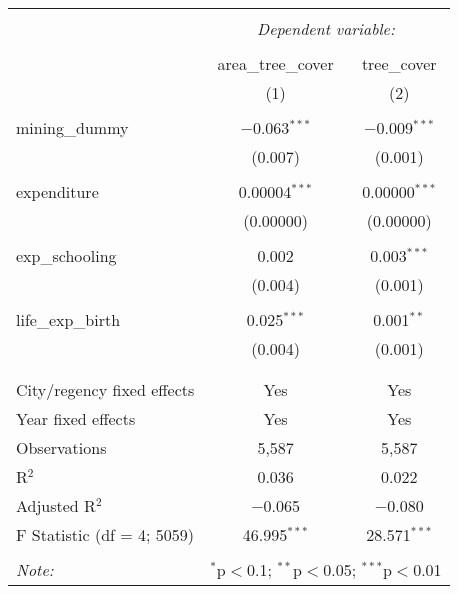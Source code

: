 
\begin{tabular}{@{\extracolsep{5pt}}lcc} 
\\[-1.8ex]\hline 
\hline \\[-1.8ex] 
 & \multicolumn{2}{c}{\textit{Dependent variable:}} \\ 
\cline{2-3} 
\\[-1.8ex] & area\_tree\_cover & tree\_cover \\ 
 & (1) & (2) \\ 
\hline \\[-1.8ex] 
 mining\_dummy & $-$0.063$^{***}$ & $-$0.009$^{***}$ \\ 
  & (0.007) & (0.001) \\ 
  & & \\ 
 expenditure & 0.00004$^{***}$ & 0.00000$^{***}$ \\ 
  & (0.00000) & (0.00000) \\ 
  & & \\ 
 exp\_schooling & 0.002 & 0.003$^{***}$ \\ 
  & (0.004) & (0.001) \\ 
  & & \\ 
 life\_exp\_birth & 0.025$^{***}$ & 0.001$^{**}$ \\ 
  & (0.004) & (0.001) \\ 
  & & \\ 
\hline \\[-1.8ex] 
City/regency fixed effects & Yes & Yes \\ 
Year fixed effects & Yes & Yes \\ 
Observations & 5,587 & 5,587 \\ 
R$^{2}$ & 0.036 & 0.022 \\ 
Adjusted R$^{2}$ & $-$0.065 & $-$0.080 \\ 
F Statistic (df = 4; 5059) & 46.995$^{***}$ & 28.571$^{***}$ \\ 
\hline 
\hline \\[-1.8ex] 
\textit{Note:}  & \multicolumn{2}{r}{$^{*}$p$<$0.1; $^{**}$p$<$0.05; $^{***}$p$<$0.01} \\ 
\end{tabular} 
